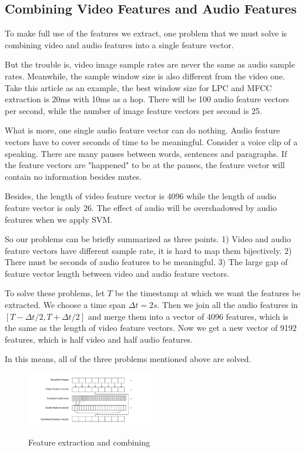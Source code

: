 \documentclass{article}
\begin{document}
\subsection{Combining Video Features and Audio Features}

	To make full use of the features we extract, one problem that we must solve is combining video and audio features into a single feature vector. 
	
	But the trouble is, video image sample rates are never the same as audio sample rates. Meanwhile, the sample window size is also different from the video one. Take this article as an example, the best window size for LPC and MFCC extraction is 20ms with 10ms as a hop. There will be 100 audio feature vectors per second, while the number of image feature vectors per second is 25. 
	
	What is more, one single audio feature vector can do nothing. Audio feature vectors have to cover seconds of time to be meaningful. Consider a voice clip of a speaking. There are many pauses between words, sentences and paragraphs. If the feature vectors are "happened" to be at the pauses, the feature vector will contain no information besides mutes. 
	
	Besides, the length of video feature vector is 4096 while the length of audio feature vector is only 26. The effect of audio will be overshadowed by audio features when we apply SVM.
	
	So our problems can be briefly summarized as three points. 1) Video and audio feature vectors have different sample rate, it is hard to map them bijectively. 2) There must be seconds of audio features to be meaningful. 3) The large gap of feature vector length between video and audio feature vectors.
	
	To solve these problems, let $T$ be the timestamp at which we want the features be extracted. We choose a time span $\Delta t = 2s$. Then we join all the audio features in $[T-\Delta t/2, T+\Delta t/2]$ and merge them into a vector of 4096 features, which is the same as the length of video feature vectors. Now we get a new vector of 9192 features, which is half video and half audio features. 
	
	In this means, all of the three problems mentioned above are solved. 

	\begin{figure}
	\centering
	\includegraphics[width=0.5\textwidth]{img/features.pdf}
	\label{fig:features}
	\caption{Feature extraction and combining}
	\end{figure}
\end{document}
